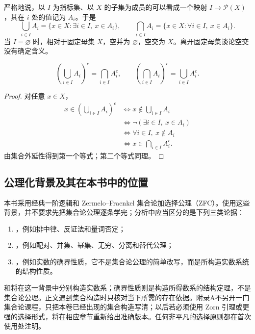 严格地说，以 \(I\) 为指标集、以 \(X\) 的子集为成员的可以看成一个映射 \(I\to\mathcal P(X)\)，其在 \(i\) 处的值记为 \(A_i\)。于是
\[
  \bigcup_{i\in I}A_i=\{x\in X:\exists i\in I,\ x\in A_i\},\qquad
  \bigcap_{i\in I}A_i=\{x\in X:\forall i\in I,\ x\in A_i\}.
\]
当 \(I=\varnothing\) 时，相对于固定母集 \(X\)，空并为 \(\varnothing\)，空交为 \(X\)。离开固定母集谈论空交没有确定含义。

\begin{proposition}
\[
  \left(\bigcup_{i\in I}A_i\right)^c=\bigcap_{i\in I}A_i^c,
  \qquad
  \left(\bigcap_{i\in I}A_i\right)^c=\bigcup_{i\in I}A_i^c.
\]
\end{proposition}

\begin{proof}
对任意 \(x\in X\)，
\[
\begin{aligned}
x\in\left(\bigcup_{i\in I}A_i\right)^c
&\Leftrightarrow x\notin\bigcup_{i\in I}A_i\\
&\Leftrightarrow \neg(\exists i\in I,\ x\in A_i)\\
&\Leftrightarrow \forall i\in I,\ x\notin A_i\\
&\Leftrightarrow x\in\bigcap_{i\in I}A_i^c.
\end{aligned}
\]
由集合外延性得到第一个等式；第二个等式同理。
\end{proof}

\subsection{公理化背景及其在本书中的位置}

本书采用经典一阶逻辑和 Zermelo--Fraenkel 集合论加选择公理（ZFC）。使用这些背景，并不要求先把集合论公理逐条学完；分析中应当区分的是下列三类论据：
\begin{enumerate}
  \item {}，例如排中律、反证法和量词否定；
  \item {}，例如配对、并集、幂集、无穷、分离和替代公理；
  \item {}，例如实数的确界性质，它不是集合论公理的简单改写，而是所构造实数系统的结构性质。
\end{enumerate}
和将在这一背景中分别构造实数系；确界性质则是构造所得数系的结构定理，不是集合论公理。正文遇到集合构造时只核对当下所需的存在依据。附录A不另开一门集合论课程，只把本卷已经出现的集合构造写清；以后若必须使用 Zorn 引理或更强的选择形式，将在相应章节重新给出准确版本。任何非平凡的选择原则都在首次使用处注明。

